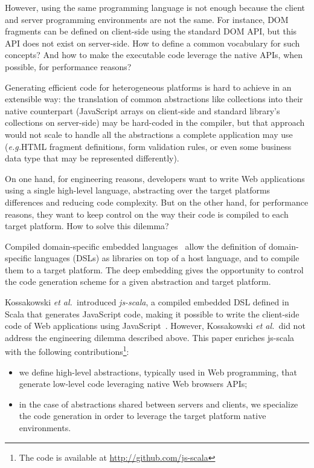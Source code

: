 \documentclass[preprint]{sigplanconf}
\newcommand{\eg}{\emph{e.g.}}
\newcommand{\etal}{\emph{et al.~}}
\begin{document}
However, using the same programming language is not enough because the client and server programming environments
are not the same. For instance, DOM fragments can be defined on client-side using the standard DOM API, but this
API does not exist on server-side. How to define a common vocabulary for such concepts? And how to make the
executable code leverage the native APIs, when possible, for performance reasons?

Generating efficient code for heterogeneous platforms is hard to achieve in an extensible way: the translation of
common abstractions like collections into their native counterpart (JavaScript arrays on client-side and standard
library's collections on server-side) may be hard-coded in the compiler, but that approach would not scale to handle
all the abstractions a complete application may use (\eg HTML fragment definitions, form validation rules, or even
some business data type that may be represented differently).

On one hand, for engineering reasons, developers want to write Web applications using a single high-level language,
abstracting over the target platforms differences and reducing code complexity. But on the other hand, for
performance reasons, they want to keep control on the way their code is compiled to each target platform. How to
solve this dilemma?

Compiled domain-specific embedded languages~\cite{Elliott2003_Compiling} allow the definition of domain-specific
languages (DSLs) as libraries on top of a host language, and to compile them to a target platform. The deep embedding
gives the opportunity to control the code generation scheme for a given abstraction and target platform.

Kossakowski \etal introduced \emph{js-scala}, a compiled embedded DSL defined in Scala that generates JavaScript
code, making it possible to write the client-side code of Web applications using
JavaScript~\cite{Kossakowski12_JsDESL}. However, Kossakowski \etal did not address the engineering dilemma described
above. This paper enriches js-scala with the following contributions\footnote{The code is available at
\href{http://github.com/js-scala}{http://github.com/js-scala}}:

\begin{itemize}
 \item we define high-level abstractions, typically used in Web programming, that generate low-level code leveraging
native Web browsers APIs;
 \item in the case of abstractions shared between servers and clients, we specialize the code generation in order to
leverage the target platform native environments.
\end{itemize}
\end{document}

